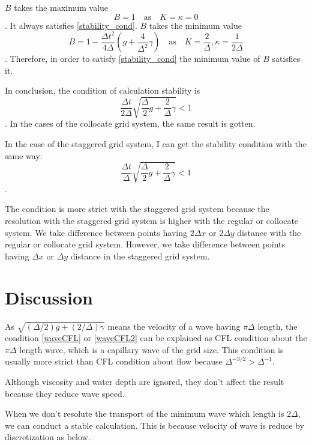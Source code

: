 \documentclass[a4paper,11pt]{article}
\newcommand{\as}{\quad\mathrm{as}\quad}
\begin{document}
$B$ takes the maximum value
\begin{equation}
B=1 \as K = \kappa = 0 
\end{equation}
. It always satisfies \eqref{stability_cond}. $B$ takes the minimum value
\begin{equation}
B= 1 - \frac{\Delta t^2}{4 \Delta} \left(g + \frac{4}{\Delta^2}\gamma\right)
\as K = \frac{2}{\Delta}, \kappa = \frac{1}{2\Delta}
\end{equation}
. Therefore, in order to satisfy \eqref{stability_cond} the minimum value of $B$ satisfies it.

In conclusion, the condition of calculation stability is 
\begin{equation}
\frac{\Delta t}{2\Delta}\sqrt{\frac{\Delta}{2}g +
\frac{2}{\Delta}\gamma} < 1 \label{waveCFL}
\end{equation}
. 
In the cases of the collocate grid system, the same result is gotten.

In the case of the staggered grid system, I can get the stability condition with the same way:
\begin{equation}
\frac{\Delta t}{\Delta}\sqrt{\frac{\Delta}{2}g +
\frac{2}{\Delta}\gamma} < 1 \label{waveCFL2}
\end{equation}
.

The condition is more strict with the staggered grid system because the resolution with the staggered grid system is higher with the regular or collocate system.
We take difference between points having $2\Delta x$ or $2\Delta y$ distance with the regular or collocate grid system. However, we take difference between points having $\Delta x$ or $\Delta y$ distance in the staggered grid system.

\section{Discussion}

As $\sqrt{(\Delta /2)g + (2/\Delta)\gamma}$ means the velocity of a wave having $\pi\Delta$ length,
the condition \eqref{waveCFL} or \eqref{waveCFL2} can be explained as CFL condition about the $\pi\Delta$ length wave, which is a capillary wave of the grid size.
This condition is usually more strict than CFL condition about flow because $\Delta^{-3/2} > \Delta^{-1}$.

Although viscosity and water depth are ignored, they don't affect the result because they reduce wave speed. 

When we don't resolute the transport of the minimum wave which length is $2\Delta$, we can conduct a stable calculation. This is because velocity of wave is reduce by discretization as below.
\end{document}
